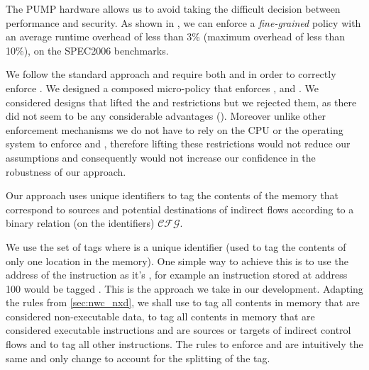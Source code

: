 The PUMP hardware allows us to avoid taking the difficult decision between
performance and security. As shown in \cite{pump_asplos2015}, we can enforce a
\emph{fine-grained} \CFI policy with an average runtime overhead of less than 3\%
(maximum overhead of less than 10\%), on the SPEC2006 benchmarks.

We follow the standard approach and require both \NXD and \NWC in
order to correctly enforce \CFI. We designed a composed micro-policy
that enforces \NXD, \NWC and \CFI. We considered designs that lifted
the \NXD and \NWC restrictions but we rejected them, as there did not
seem to be any considerable advantages (). Moreover unlike
other \CFI enforcement mechanisms we do not have to rely on the CPU or
the operating system to enforce \NXD and \NWC, therefore lifting these
restrictions would not reduce our assumptions and consequently would
not increase our confidence in the robustness of our approach.



Our approach uses unique identifiers to tag the contents of the memory that
correspond to sources and potential destinations of indirect flows according to
a binary relation (on the identifiers) $\mathcal{CFG}$.

We use the set of tags 
where \id is a unique identifier (\IE used to tag the contents of only
one location in the memory). One simple way to achieve this is to use
the address of the instruction as it's \id, for example an instruction
stored at address 100 would be tagged . This is the
approach we take in our development. Adapting the rules from
\ref{sec:nwc_nxd}, we shall use \DATAname to tag all contents in
memory that are considered non-executable data,  to tag
all contents in memory that are considered executable instructions and
are sources or targets of indirect control flows and \INSTR{$\bot$} to
tag all other instructions. The rules to enforce \NWC and \NXD are
intuitively the same and only change to account for the splitting of
the \INSTRname tag.

